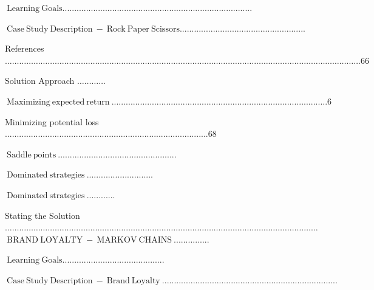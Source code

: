 \documentclass[10pt]{article}
\begin{document}
$\mathrm{~ L e a r n i n g ~ G o a l s . . . . . . . . . . . . . . . . . . . . . . . . . . . . . . . . . . . . . . . . . . . . . . . . . . . . . . . . . . . . . . . . . . . . . . . . . . . . . . . .}$

$\mathrm{~ C a s e ~ S t u d y ~ D e s c r i p t i o n ~ - ~ R o c k ~ P a p e r ~ S c i s s o r s . . . . . . . . . . . . . . . . . . . . . . . . . . . . . . . . . . . . . . . . . . . . . . . . . . . . .}$

References $\ldots \ldots \ldots \ldots \ldots \ldots \ldots \ldots \ldots \ldots \ldots \ldots \ldots \ldots \ldots \ldots \ldots \ldots \ldots \ldots \ldots \ldots \ldots \ldots \ldots \ldots \ldots \ldots \ldots \ldots \ldots \ldots \ldots \ldots \ldots \ldots \ldots \ldots \ldots \ldots \ldots \ldots \ldots \ldots \ldots \ldots \ldots \ldots \ldots \ldots 66$

Solution Approach $\ldots \ldots \ldots \ldots$

$\mathrm{~ M a x i m i z i n g ~ e x p e c t e d ~ r e t u r n ~ . . . . . . . . . . . . . . . . . . . . . . . . . . . . . . . . . . . . . . . . . . . . . . . . . . . . . . . . . . . . . . . . . . . . . . . . . . . . . . . . . . . . . . . . . . . 6}$

Minimizing potential loss ......................................................................................68

$\mathrm{~ S a d d l e ~ p o i n t s ~ . . . . . . . . . . . . . . . . . . . . . . . . . . . . . . . . . . . . . . . . . . . . . . . . . .}$

$\mathrm{~ D o m i n a t e d ~ s t r a t e g i e s ~ . . . . . . . . . . . . . . . . . . . . . . . . . . . .}$

$\mathrm{~ D o m i n a t e d ~ s t r a t e g i e s ~ . . . . . . . . . . . .}$

Stating the Solution $\ldots \ldots \ldots \ldots \ldots \ldots \ldots \ldots \ldots \ldots \ldots \ldots \ldots \ldots \ldots \ldots \ldots \ldots \ldots \ldots \ldots \ldots \ldots \ldots \ldots \ldots \ldots \ldots \ldots \ldots \ldots \ldots \ldots \ldots \ldots \ldots \ldots \ldots \ldots \ldots \ldots \ldots \ldots \ldots$ $\mathrm{~ B R A N D ~ L O Y A L T Y ~ - ~ M A R K O V ~ C H A I N S ~ . . . . . . . . . . . . . . .}$

$\mathrm{~ L e a r n i n g ~ G o a l s . . . . . . . . . . . . . . . . . . . . . . . . . . . . . . . . . . . . . . . . . . .}$

$\mathrm{~ C a s e ~ S t u d y ~ D e s c r i p t i o n ~ - ~ B r a n d ~ L o y a l t y ~ . . . . . . . . . . . . . . . . . . . . . . . . . . . . . . . . . . . . . . . . . . . . . . . . . . . . . . . . . . . . . . . . . . . . . . . . . .}$
\end{document}
